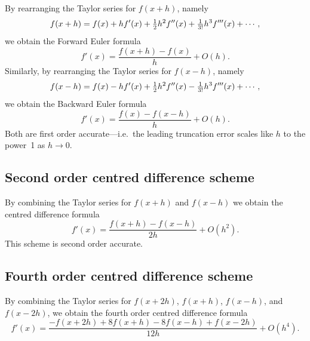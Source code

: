 By rearranging the Taylor series for $ f(x+h) $,
namely
%
\begin{equation}
f(x+h) = f(x) + h f'(x) + \tfrac{1}{2} h^2 f''(x) + \tfrac{1}{3!} h^3 f'''(x) + \cdots, \notag
\end{equation}
%
we obtain the Forward Euler formula
\begin{equation}
\label{eq:fwdeuler}
f'(x) = \frac{f(x+h) - f(x)}{h} + O(h).
\end{equation}
Similarly, by rearranging the Taylor series for \( f(x-h) \), namely
%
\begin{equation}
f(x-h) = f(x) - h f'(x) + \tfrac{1}{2} h^2 f''(x) - \tfrac{1}{3!} h^3 f'''(x) + \cdots, \notag
\end{equation}
%
we obtain the Backward Euler formula
\begin{equation}
\label{eq:bwdeuler}
f'(x) = \frac{f(x) - f(x-h)}{h} + O(h).
\end{equation}
Both are first order accurate---i.e.\ the leading truncation error
scales like $ h $ to the power~1 as $ h \rightarrow 0 $.

\subsection{Second order centred difference scheme}

By combining the Taylor series for $ f(x+h) $ and $ f(x-h) $
we obtain the centred difference formula
\begin{equation}
\label{eq:cd2}
f'(x) = \frac{f(x+h) - f(x-h)}{2h} + O(h^2).
\end{equation}
This scheme is second order accurate.

\subsection{Fourth order centred difference scheme}

By combining the Taylor series for
$ f(x+2h) $, $ f(x+h) $, $ f(x-h) $, and $ f(x-2h) $,
we obtain the fourth order centred difference formula
\begin{displaymath}
f'(x) = \frac{-f(x+2h) + 8 f(x+h) -  8 f(x-h) + f(x-2h)}{12h} + O(h^4).
\end{displaymath}


